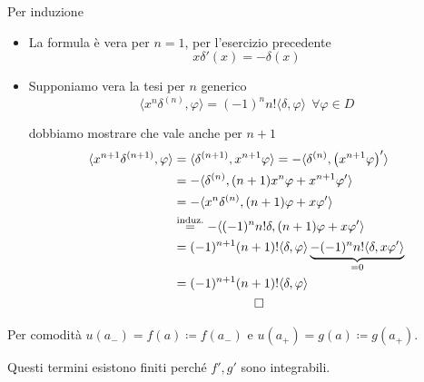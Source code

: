 Per induzione
\begin{itemize}
\item La formula è vera per $n = 1$, per l'esercizio precedente\begin{equation*}
x\delta '(x) = - \delta (x)
\end{equation*}
\item Supponiamo vera la tesi per $n$ generico\begin{equation*}
\langle x^{n} \delta ^{(n)} ,\varphi \rangle = (- 1)^{n} n!\langle \delta ,\varphi \rangle \ \ \forall \varphi \in D
\end{equation*}

dobbiamo mostrare che vale anche per $n + 1$\begin{gather*}
\begin{aligned}
\langle x^{n + 1} \delta ^{(n + 1)} ,\varphi \rangle  & = \langle \delta ^{(n + 1)} ,x^{n + 1} \varphi \rangle = - \langle \delta ^{(n)} ,\left(x^{n + 1} \varphi \right) '\rangle \\
 & = - \langle \delta ^{(n)} ,(n + 1) x^{n} \varphi + x^{n + 1} \varphi '\rangle \\
 & = - \langle x^{n} \delta ^{(n)} ,(n + 1) \varphi + x\varphi '\rangle \\
 & \overset{\text{induz.}}{ = } - \langle (- 1)^{n} n!\delta ,(n + 1) \varphi + x\varphi '\rangle \\
 & = (- 1)^{n + 1}(n + 1) !\langle \delta ,\varphi \rangle \underbrace{ - (- 1)^{n} n!\langle \delta ,x\varphi '\rangle }_{ = 0}\\
 & = (- 1)^{n + 1}(n + 1) !\langle \delta ,\varphi \rangle 
\end{aligned}\\
\qed 
\end{gather*}
\end{itemize}
\Soluzione

Per comodità $u(a_{ - }) = f(a) \coloneqq f(a_{ - })$ e $u(a_{ + }) = g(a) \coloneqq g(a_{ + })$.

Questi termini esistono finiti perché $f',g'$ sono integrabili.

